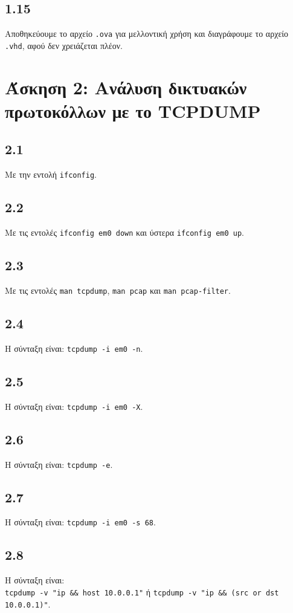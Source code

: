 \documentclass[a4paper, 12pt]{article}
\begin{document}
	\subsection*{1.15}
		Αποθηκεύουμε το αρχείο \verb|.ova| για μελλοντική χρήση και διαγράφουμε το αρχείο \verb|.vhd|, αφού δεν χρειάζεται πλέον.
	
\section*{Άσκηση 2: Ανάλυση δικτυακών πρωτοκόλλων με το TCPDUMP}

	\subsection*{2.1}
		Με την εντολή \verb|ifconfig|.

	\subsection*{2.2}
		Με τις εντολές \verb|ifconfig em0 down| και ύστερα \verb|ifconfig em0 up|.

	\subsection*{2.3}
		Με τις εντολές \verb|man tcpdump|, \verb|man pcap| και \verb|man pcap-filter|.

	\subsection*{2.4}
		Η σύνταξη είναι: \verb|tcpdump -i em0 -n|.

	\subsection*{2.5}
		Η σύνταξη είναι: \verb|tcpdump -i em0 -X|.

	\subsection*{2.6}
		Η σύνταξη είναι: \verb|tcpdump -e|.
		
	\subsection*{2.7}
		Η σύνταξη είναι: \verb|tcpdump -i em0 -s 68|.

	\subsection*{2.8}
		Η σύνταξη είναι: \\
		\verb|tcpdump -v "ip && host 10.0.0.1"| ή \verb+tcpdump -v "ip && (src or dst 10.0.0.1)"+.
\end{document}
